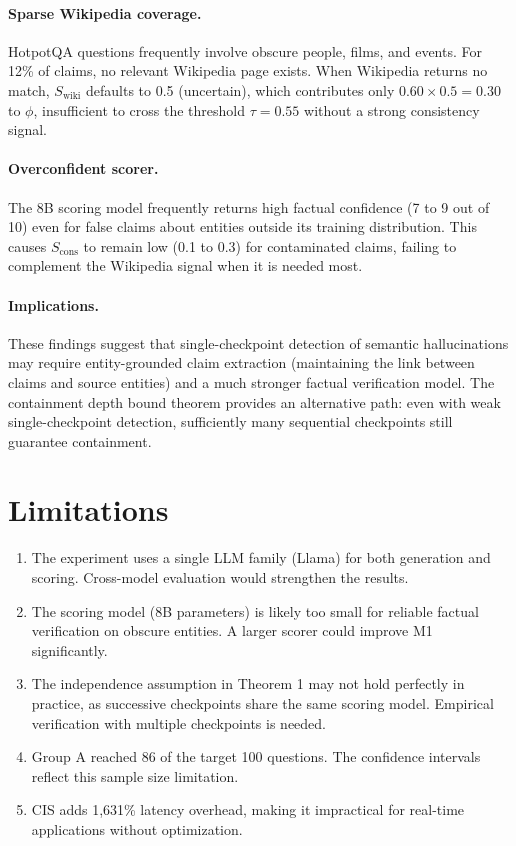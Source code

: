 \documentclass[11pt,a4paper]{article}
\begin{document}
\paragraph{Sparse Wikipedia coverage.} HotpotQA questions frequently involve obscure people, films, and events. For 12\% of claims, no relevant Wikipedia page exists. When Wikipedia returns no match, $S_{\text{wiki}}$ defaults to 0.5 (uncertain), which contributes only $0.60 \times 0.5 = 0.30$ to $\phi$, insufficient to cross the threshold $\tau = 0.55$ without a strong consistency signal.

\paragraph{Overconfident scorer.} The 8B scoring model frequently returns high factual confidence (7 to 9 out of 10) even for false claims about entities outside its training distribution. This causes $S_{\text{cons}}$ to remain low (0.1 to 0.3) for contaminated claims, failing to complement the Wikipedia signal when it is needed most.

\paragraph{Implications.} These findings suggest that single-checkpoint detection of semantic hallucinations may require entity-grounded claim extraction (maintaining the link between claims and source entities) and a much stronger factual verification model. The containment depth bound theorem provides an alternative path: even with weak single-checkpoint detection, sufficiently many sequential checkpoints still guarantee containment.

\section{Limitations}

\begin{enumerate}
    \item The experiment uses a single LLM family (Llama) for both generation and scoring. Cross-model evaluation would strengthen the results.
    \item The scoring model (8B parameters) is likely too small for reliable factual verification on obscure entities. A larger scorer could improve M1 significantly.
    \item The independence assumption in Theorem 1 may not hold perfectly in practice, as successive checkpoints share the same scoring model. Empirical verification with multiple checkpoints is needed.
    \item Group A reached 86 of the target 100 questions. The confidence intervals reflect this sample size limitation.
    \item CIS adds 1,631\% latency overhead, making it impractical for real-time applications without optimization.
\end{enumerate}
\end{document}
